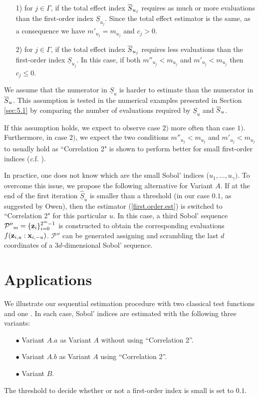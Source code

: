 \begin{itemize}
\item[1)] for $j \in \Gamma$, if the total effect index $\ov{$S$}_{u_j}$ requires as much or more evaluations than the first-order index $\underline{S}_{u_j}$. Since the total effect estimator is the same, as a consequence we have $m'_{u_j}=m_{u_j}$ and $c_j >0$.
\item[2)] for $j \in \Gamma$, if the total effect index $\ov{$S$}_{u_j}$ requires less evaluations than the first-order index $\underline{S}_{u_j}$. In this case, if both $m''_{u_j} < m_{u_j}$ and $m'_{u_j} < m_{u_j}$ then $c_j \leq 0$.  
\end{itemize}
We assume that the numerator in $\underline{S}_u$ is harder to estimate than the numerator in $\ov{$S$}_u$. This assumption is tested in the numerical examples presented in Section \ref{sec:5.1} by comparing the number of evaluations required by $\underline{S}_u$ and $\ov{$S$}_u$. 

If this assumption holds, we expect to observe case $2)$ more often than case $1)$. Furthermore, in case $2)$, we expect the two conditions $m''_{u_j} < m_{u_j}$ and $m'_{u_j} < m_{u_j}$ to usually hold as ``Correlation 2" is shown to perform better for small first-order indices (\textit c.f. \cite{Owen}).
\bigskip

In practice, one does not know which are the small Sobol' indices ($u_1,\dots,u_\gamma)$. To overcome this issue, we propose the following alternative for Variant $A$. If at the end of the first iteration $\widehat{\underline{S}}_u$ is smaller than a threshold (in our case $0.1$, as suggested by Owen), then the estimator (\ref{first.order.est}) is switched to ``Correlation 2" for this particular $u$. In this case, a third Sobol' sequence $\mathcal{P''}_{m}=\{\boldsymbol{\mathbf{z}}_i\}_{i=0}^{2^m-1}$ is constructed to obtain the corresponding evaluations $f({\boldsymbol{\mathbf{z}}}_{i,u}:{\boldsymbol{\mathbf{x}}}_{i,-u})$. $\mathcal{P''}$ can be generated assigning and scrambling the last $d$ coordinates of a $3d$-dimensional Sobol' sequence.

\section{Applications}
\label{sec:5}

We illustrate our sequential estimation procedure with two classical test functions and one . In each case, Sobol' indices are estimated with the following three variants:
\begin{itemize}
\item[$\bullet$] Variant $A.a$ as Variant $A$ without using ``Correlation 2''. 
\item[$\bullet$] Variant $A.b$ as Variant $A$ using ``Correlation 2''.
\item[$\bullet$] Variant $B$.
\end{itemize}
The threshold to decide whether or not a first-order index is small is set to $0.1$. 

